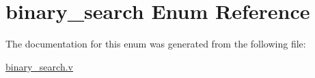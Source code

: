 \hypertarget{enumbinary__search}{}\section{binary\+\_\+search Enum Reference}
\label{enumbinary__search}


The documentation for this enum was generated from the following file\+:\begin{DoxyCompactItemize}
\item 
\mbox{\hyperlink{binary__search_8v}{binary\+\_\+search.\+v}}\end{DoxyCompactItemize}
